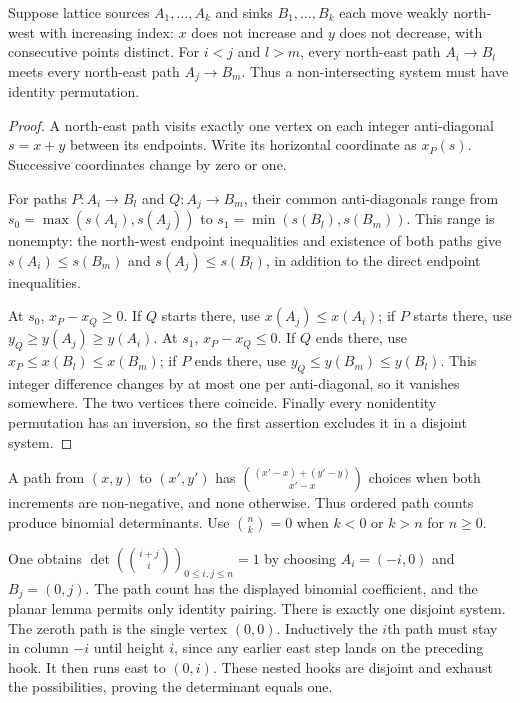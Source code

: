 \begin{lemma}\label{linear:lem:planar}
Suppose lattice sources $A_1,\ldots,A_k$ and sinks $B_1,\ldots,B_k$ each move weakly north-west with increasing index: $x$ does not increase and $y$ does not decrease, with consecutive points distinct. For $i<j$ and $l>m$, every north-east path $A_i\to B_l$ meets every north-east path $A_j\to B_m$. Thus a non-intersecting system must have identity permutation.
\end{lemma}
\begin{proof}
A north-east path visits exactly one vertex on each integer anti-diagonal $s=x+y$ between its endpoints. Write its horizontal coordinate as $x_P(s)$. Successive coordinates change by zero or one.

For paths $P:A_i\to B_l$ and $Q:A_j\to B_m$, their common anti-diagonals range from $s_0=\max(s(A_i),s(A_j))$ to $s_1=\min(s(B_l),s(B_m))$. This range is nonempty: the north-west endpoint inequalities and existence of both paths give $s(A_i)\le s(B_m)$ and $s(A_j)\le s(B_l)$, in addition to the direct endpoint inequalities.

At $s_0$, $x_P-x_Q\ge0$. If $Q$ starts there, use $x(A_j)\le x(A_i)$; if $P$ starts there, use $y_Q\ge y(A_j)\ge y(A_i)$. At $s_1$, $x_P-x_Q\le0$. If $Q$ ends there, use $x_P\le x(B_l)\le x(B_m)$; if $P$ ends there, use $y_Q\le y(B_m)\le y(B_l)$. This integer difference changes by at most one per anti-diagonal, so it vanishes somewhere. The two vertices there coincide. Finally every nonidentity permutation has an inversion, so the first assertion excludes it in a disjoint system.
\end{proof}

A path from $(x,y)$ to $(x',y')$ has $\binom{(x'-x)+(y'-y)}{x'-x}$ choices when both increments are non-negative, and none otherwise. Thus ordered path counts produce binomial determinants. Use $\binom nk=0$ when $k<0$ or $k>n$ for $n\ge0$.

\begin{example}\label{linear:ex:binomialdet}
One obtains $\det(\binom{i+j}{i})_{0\le i,j\le n}=1$ by choosing $A_i=(-i,0)$ and $B_j=(0,j)$. The path count has the displayed binomial coefficient, and the planar lemma permits only identity pairing. There is exactly one disjoint system. The zeroth path is the single vertex $(0,0)$. Inductively the $i$th path must stay in column $-i$ until height $i$, since any earlier east step lands on the preceding hook. It then runs east to $(0,i)$. These nested hooks are disjoint and exhaust the possibilities, proving the determinant equals one.
\end{example}


